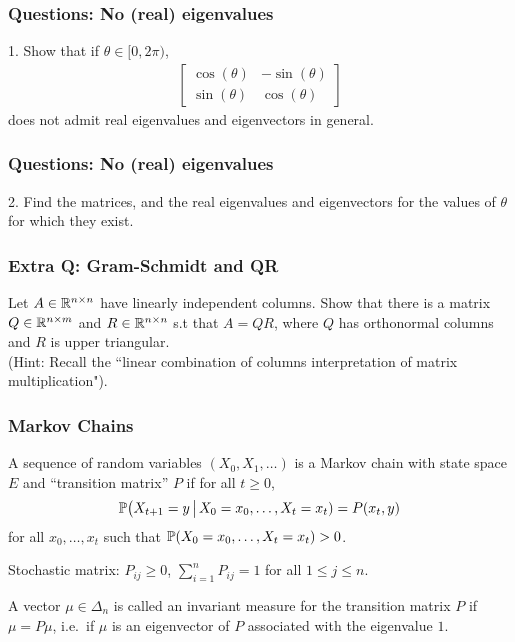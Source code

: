 \documentclass{beamer}
\begin{document}
\begin{frame}[t]
\frametitle{Questions: No (real) eigenvalues}
1. Show that if $\theta \in [0,2\pi)$,
\begin{align*}
\begin{bmatrix}
\cos(\theta) & -\sin(\theta) \\
\sin(\theta) & \cos(\theta)
\end{bmatrix}
\end{align*}
does not admit real eigenvalues and eigenvectors in general.
\pause
\end{frame}

\begin{frame}[t]
\frametitle{Questions: No (real) eigenvalues}
2. Find the matrices, and the real eigenvalues and eigenvectors for the values of $\theta$ for which they exist.
\pause
\end{frame}

\begin{frame}[t]
\frametitle{Extra Q: Gram-Schmidt and QR}
Let $A\in \R^{n\times n}$ have linearly independent columns. Show that there is a matrix $Q\in \R^{n \times m}$ and $R \in \R^{n\times n} $ s.t that $A=QR$, where $Q$ has orthonormal columns and $R$ is upper triangular. \\
\medskip
(Hint: Recall the ``linear combination of columns interpretation of matrix multiplication").
\pause
\end{frame}

\iffalse
\begin{frame}[t]
\frametitle{Markov Chains}
\begin{definition}
	A sequence of random variables $(X_0, X_1, \dots)$ is a Markov chain with state space $E$ and ``transition matrix'' $P$ if for all $t \geq 0$, 
	$$
	\P\big( X_{t+1} = y \, \big| \, X_0= x_0, \dots, X_t = x_t ) = P(x_t,y)
	$$
	for all $x_0, \dots, x_t$ such that $\P(X_0 = x_0, \dots, X_t = x_t) >0$.
\end{definition}
Stochastic matrix: $P_{ij} \geq 0$, $\sum_{i=1}^n P_{ij} = 1$ for all $1 \leq j \leq n$.
\begin{definition}
	A vector $\mu \in \Delta_n$ is called an invariant measure for the transition matrix $P$ if $\mu = P \mu$, i.e.\ if $\mu$ is an eigenvector of $P$ associated with the eigenvalue $1$.
\end{definition}
\end{frame}
\end{document}
